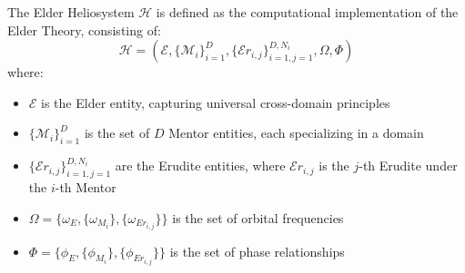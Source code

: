 \begin{definition}
\label{def:heliosystem_structure}
The Elder Heliosystem $\mathcal{H}$ is defined as the computational implementation of the Elder Theory, consisting of:
\begin{equation}
\mathcal{H} = (\mathcal{E}, \{\mathcal{M}_i\}_{i=1}^D, \{\mathcal{E}r_{i,j}\}_{i=1,j=1}^{D,N_i}, \Omega, \Phi)
\end{equation}
where:
\begin{itemize}
    \item $\mathcal{E}$ is the Elder entity, capturing universal cross-domain principles
    \item $\{\mathcal{M}_i\}_{i=1}^D$ is the set of $D$ Mentor entities, each specializing in a domain
    \item $\{\mathcal{E}r_{i,j}\}_{i=1,j=1}^{D,N_i}$ are the Erudite entities, where $\mathcal{E}r_{i,j}$ is the $j$-th Erudite under the $i$-th Mentor
    \item $\Omega = \{\omega_E, \{\omega_{M_i}\}, \{\omega_{Er_{i,j}}\}\}$ is the set of orbital frequencies
    \item $\Phi = \{\phi_E, \{\phi_{M_i}\}, \{\phi_{Er_{i,j}}\}\}$ is the set of phase relationships
\end{itemize}
\end{definition}

